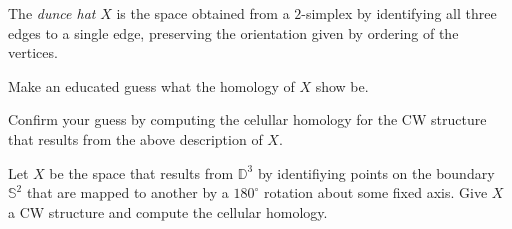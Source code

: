 \documentclass[11pt]{book}
\numberwithin{dummy}{section}
\theoremstyle{nonumberbreak}
\newenvironment{prob}[1][]{\ifthenelse{\equal{#1}{}}{\problem}{\problem[#1]}\rm}{\endproblem}
\newcommand{\Sph}{\mathbb{S}}
\begin{document}
\begin{spacing}{1.4}
\begin{prob}      %
The \textit{dunce hat} $X$ is the space obtained from a $2$-simplex by identifying all three edges to a single edge, preserving the orientation given by ordering of the vertices.
\begin{compactenum}
\item Make an educated guess what the homology of $X$ show be.
\item Confirm your guess by computing the celullar homology for the CW structure that results from the above description of $X$.
\end{compactenum}
\end{prob}



\begin{prob} %
Let $X$ be the space that results from $\mathbb{D}^3$ by identifiying points on the boundary $\Sph^2$ that are mapped to another by a $180^{\circ}$ rotation about some fixed axis. Give $X$ a CW structure and compute the cellular homology.

\end{prob}
























































\end{spacing}
\end{document}
